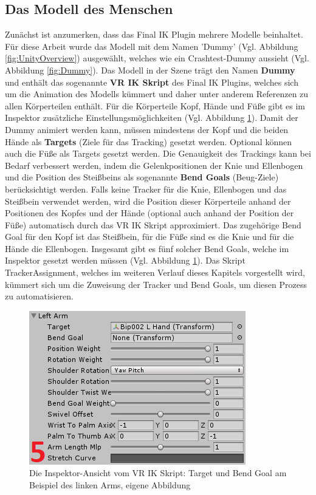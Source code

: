 \subsection{Das Modell des Menschen}\label{sec:MMModell}
Zunächst ist anzumerken, dass das Final IK Plugin mehrere Modelle beinhaltet. Für diese Arbeit wurde das Modell mit dem Namen 'Dummy' (Vgl. Abbildung \ref{fig:UnityOverview}) ausgewählt, welches wie ein Crashtest-Dummy aussieht (Vgl. Abbildung \ref{fig:Dummy}).
\newline
Das Modell in der Szene trägt den Namen \textbf{Dummy} und enthält das sogenannte \textbf{VR IK Skript} des Final IK Plugins, welches sich um die Animation des Modells kümmert und daher unter anderem Referenzen zu allen Körperteilen enthält. Für die Körperteile Kopf, Hände und Füße gibt es im Inspektor zusätzliche Einstellungsmöglichkeiten (Vgl. Abbildung \ref{fig:TargetBendGoal}). Damit der Dummy animiert werden kann, müssen mindestens der Kopf und die beiden Hände als \textbf{Targets} (Ziele für das Tracking) gesetzt werden. Optional können auch die Füße als Targets gesetzt werden. 
Die Genauigkeit des Trackings kann bei Bedarf verbessert werden, indem die Gelenkpositionen der Knie und Ellenbogen und die Position des Steißbeins als sogenannte \textbf{Bend Goals} (Beug-Ziele) berücksichtigt werden. Falls keine Tracker für die Knie, Ellenbogen und das Steißbein verwendet werden, wird die Position dieser Körperteile anhand der Positionen des Kopfes und der Hände (optional auch anhand der Position der Füße) automatisch durch das VR IK Skript approximiert.
Das zugehörige Bend Goal für den Kopf ist das Steißbein, für die Füße sind es die Knie und für die Hände die Ellenbogen. Insgesamt gibt es fünf solcher Bend Goals, welche im Inspektor gesetzt werden müssen (Vgl. Abbildung \ref{fig:TargetBendGoal}).
Das Skript TrackerAssignment, welches im weiteren Verlauf dieses Kapitels vorgestellt wird, kümmert sich um die Zuweisung der Tracker und Bend Goals, um diesen Prozess zu automatisieren.
\begin{figure}[h]
	\centering
	\includegraphics[width=0.35\linewidth]{Bilder/A36_TargetsBendGoals2}
	\caption{Die Inspektor-Ansicht vom VR IK Skript: Target und Bend Goal am Beispiel des linken Arms, eigene Abbildung}
	\label{fig:TargetBendGoal}
\end{figure}
